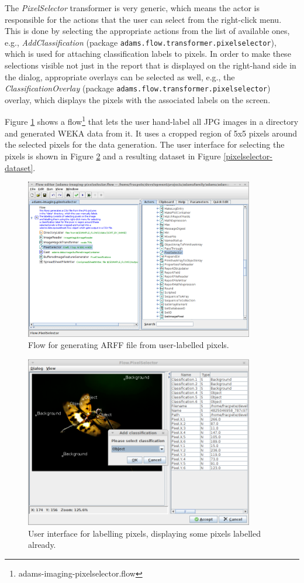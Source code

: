 \documentclass[a4paper]{book}
\begin{document}
The \textit{PixelSelector} transformer is very generic, which means the actor
is responsible for the actions that the user can select from the right-click
menu. This is done by selecting the appropriate actions from the list of
available ones, e.g., \textit{AddClassification} (package
\texttt{adams.flow.transformer.pixelselector}), which is used for attaching
classification labels to pixels. In order to make these selections visible not
just in the report that is displayed on the right-hand side in the dialog,
appropriate overlays can be selected as well, e.g., the
\textit{ClassificationOverlay} (package
\texttt{adams.flow.transformer.pixelselector}) overlay, which displays the
pixels with the associated labels on the screen.

Figure \ref{pixelselector-flow} shows a
flow\footnote{adams-imaging-pixelselector.flow} that lets the user hand-label
all JPG images in a directory and generated WEKA data from it. It uses a cropped
region of 5x5 pixels around the selected pixels for the data generation. The
user interface for selecting the pixels is shown in Figure
\ref{pixelselector-interaction} and a resulting dataset in Figure
\ref{pixelselector-dataset}.

\begin{figure}[htb]
  \centering
  \includegraphics[width=10.0cm]{images/pixelselector-flow.png}
  \caption{Flow for generating ARFF file from user-labelled pixels.}
  \label{pixelselector-flow}
\end{figure}

\begin{figure}[htb]
  \centering
  \includegraphics[width=10.0cm]{images/pixelselector-interaction.png}
  \caption{User interface for labelling pixels, displaying some pixels
  labelled already.}
  \label{pixelselector-interaction}
\end{figure}
\end{document}

